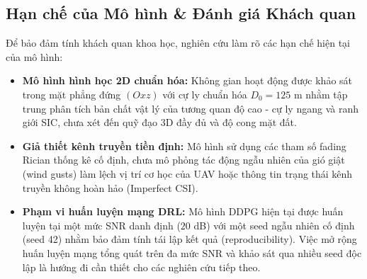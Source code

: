 \subsection*{Hạn chế của Mô hình \& Đánh giá Khách quan}
Để bảo đảm tính khách quan khoa học, nghiên cứu làm rõ các hạn chế hiện tại của mô hình:
\begin{itemize}[leftmargin=1.5em]
    \item \textbf{Mô hình hình học 2D chuẩn hóa:} Không gian hoạt động được khảo sát trong mặt phẳng đứng $(Oxz)$ với cự ly chuẩn hóa $D_0 = 125$ m nhằm tập trung phân tích bản chất vật lý của tương quan độ cao - cự ly ngang và ranh giới SIC, chưa xét đến quỹ đạo 3D đầy đủ và độ cong mặt đất.
    \item \textbf{Giả thiết kênh truyền tiền định:} Mô hình sử dụng các tham số fading Rician thống kê cố định, chưa mô phỏng tác động ngẫu nhiên của gió giật (wind gusts) làm lệch vị trí cơ học của UAV hoặc thông tin trạng thái kênh truyền không hoàn hảo (Imperfect CSI).
    \item \textbf{Phạm vi huấn luyện mạng DRL:} Mô hình DDPG hiện tại được huấn luyện tại một mức SNR danh định ($20$ dB) với một seed ngẫu nhiên cố định (seed 42) nhằm bảo đảm tính tái lập kết quả (reproducibility). Việc mở rộng huấn luyện mạng tổng quát trên đa mức SNR và khảo sát qua nhiều seed độc lập là hướng đi cần thiết cho các nghiên cứu tiếp theo.
\end{itemize}
